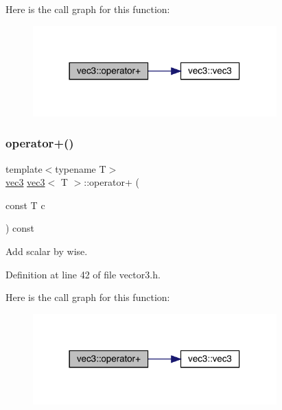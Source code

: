 Here is the call graph for this function\+:\nopagebreak
\begin{figure}[H]
\begin{center}
\leavevmode
\includegraphics[width=266pt]{structvec3_a255037f59863e54390e388dd07e7ee8f_cgraph}
\end{center}
\end{figure}
\mbox{\label{structvec3_a1b9727670ffa0a403e628bfdc966da45}} 
\subsubsection{\texorpdfstring{operator+()}{operator+()}\hspace{0.1cm}{\footnotesize\ttfamily [2/2]}}
{\footnotesize\ttfamily template$<$typename T$>$ \\
\mbox{\hyperlink{structvec3}{vec3}} \mbox{\hyperlink{structvec3}{vec3}}$<$ T $>$\+::operator+ (\begin{DoxyParamCaption}\item[{const T}]{c }\end{DoxyParamCaption}) const\hspace{0.3cm}{\ttfamily [inline]}}



Add scalar by wise. 



Definition at line 42 of file vector3.\+h.

Here is the call graph for this function\+:\nopagebreak
\begin{figure}[H]
\begin{center}
\leavevmode
\includegraphics[width=266pt]{structvec3_a1b9727670ffa0a403e628bfdc966da45_cgraph}
\end{center}
\end{figure}
\mbox{\label{structvec3_a5d12f7aba42eea6253a4ada5ce73b7d8}} 
